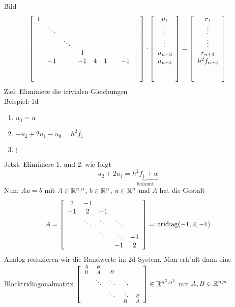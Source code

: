 \documentclass{scrartcl}
\begin{document}
Bild \\
$$
\left[
\begin{array}{c c c c c c c c c }
1 & & & & & & & & \\
 & \ddots & & & & & & & \\
 & & \ddots & & & & & \\
 & & &  1 & & & & & \\
 & -1 & & -1 & 4 & 1 & & -1 \\ 
 & & & & & & & & \\ 
 \\
\end{array}
\right]
\cdot 
\left[
\begin{array}{c}
u_1 \\ \vdots \\ \vdots \\ u_{n+3} \\ u_{n+4} \\ \ \\ \ 
\end{array}
\right]
= 
\left[
\begin{array}{c}
r_1 \\ \vdots \\ \vdots \\ r_{n+3} \\ h^2f_{n+4} \\ \ \\ \ 
\end{array}
\right]
$$
Ziel: Eliminiere die trivialen Gleichungen \\
Beispiel: 1d
\begin{enumerate}
\item $u_0 = \alpha$
\item $-u_2 + 2u_1 - u_0 = h^2 f_1$
\item $\vdots$
\end{enumerate}
Jetzt: Eliminiere 1. und 2. wie folgt
$$u_2 + 2u_1 = \underbrace{h^2f_1 + \alpha}_{\mathrm{bekannt}}$$
Nun: $Au = b$ mit $A \in \mathbb{R}^{n,n}$, $b \in \mathbb{R}^n$, $u \in \mathbb{R}^n$ und $A$ hat die Gestalt 
$$ A = \left[ 
\begin{array}{c c c c c} 
2 & -1 & & & \\ 
-1 & 2 & -1 & \\ 
& \ddots & \ddots & \ddots  \\
& & \ddots  & \ddots & -1 \\
& & & -1 & 2
\end{array}
\right] =: \mathrm{tridiag}(-1, 2, -1)$$
Analog reduzieren wir die Randwerte im 2d-System.  Man erh"alt dann eine Blocktridiagonalmatrix 
$\scriptsize \left[ 
\begin{array}{c c c c c} 
A & B & & & \\ 
B & A & B & \\ 
& \ddots & \ddots & \ddots  \\
& & \ddots  & \ddots & B \\
& & & B & A
\end{array}
\right] \in \mathbb{R}^{n^2,n^2}$ mit $A, B \in \mathbb{R}^{n,n}$
\end{document}
